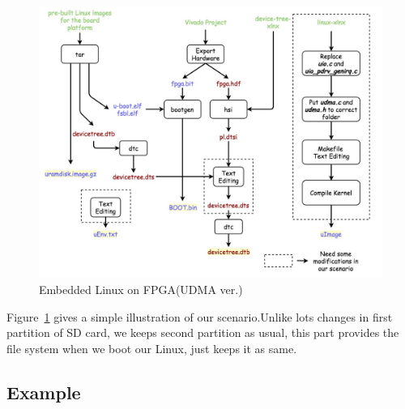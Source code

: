 \begin{figure}[!htb]
  \centering
  \includegraphics[scale=0.4]{images/new_embedded_linux.jpg}
  \caption[Embedded Linux on FPGA(UDMA ver.)]{Embedded Linux on FPGA(UDMA ver.)}
  \label{fig:Embedded Linux on FPGA(UDMA ver.)}
\end{figure}

Figure~\ref{fig:Embedded Linux on FPGA(UDMA ver.)} gives a simple illustration of our scenario.Unlike lots changes in first partition of SD card, we keeps second partition as usual, this part provides the file system when we boot our Linux, just keeps it as same.

\subsection{Example}
\label{subsec:Example}

